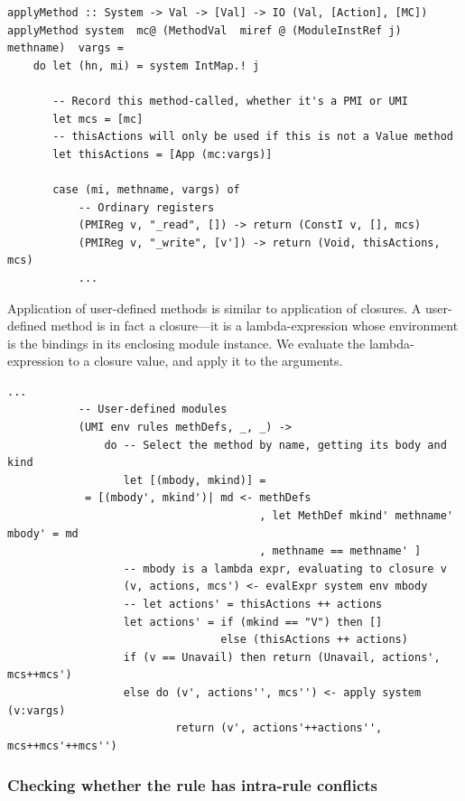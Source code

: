\documentclass[11pt]{article}
\begin{document}
\begin{Verbatim}[frame=single, commandchars=\\\{\}]
applyMethod :: System -> Val -> [Val] -> IO (Val, [Action], [MC])
applyMethod system  mc@ (MethodVal  miref @ (ModuleInstRef j)  methname)  vargs =
    do let (hn, mi) = system IntMap.! j

       -- Record this method-called, whether it's a PMI or UMI
       let mcs = [mc]
       -- thisActions will only be used if this is not a Value method
       let thisActions = [App (mc:vargs)]

       case (mi, methname, vargs) of
           -- Ordinary registers
           (PMIReg v, "_read", []) -> return (ConstI v, [], mcs)
           (PMIReg v, "_write", [v']) -> return (Void, thisActions, mcs)
           ...
\end{Verbatim}

Application of user-defined methods is similar to application of
closures.  A user-defined method is in fact a closure---it is a
lambda-expression whose environment is the bindings in its enclosing
module instance. We evaluate the lambda-expression to a closure value,
and apply it to the arguments.

\begin{Verbatim}[frame=single, commandchars=\\\{\}]
           ...
           -- User-defined modules
           (UMI env rules methDefs, _, _) ->
               do -- Select the method by name, getting its body and kind
                  let [(mbody, mkind)] =
		    = [(mbody', mkind')| md <- methDefs
                                       , let MethDef mkind' methname' mbody' = md
                                       , methname == methname' ]
                  -- mbody is a lambda expr, evaluating to closure v
                  (v, actions, mcs') <- evalExpr system env mbody
                  -- let actions' = thisActions ++ actions
                  let actions' = if (mkind == "V") then []
                                 else (thisActions ++ actions)
                  if (v == Unavail) then return (Unavail, actions', mcs++mcs')
                  else do (v', actions'', mcs'') <- apply system (v:vargs)
                          return (v', actions'++actions'', mcs++mcs'++mcs'')
\end{Verbatim}


\subsubsection{Checking whether the rule has intra-rule conflicts}
\end{document}
